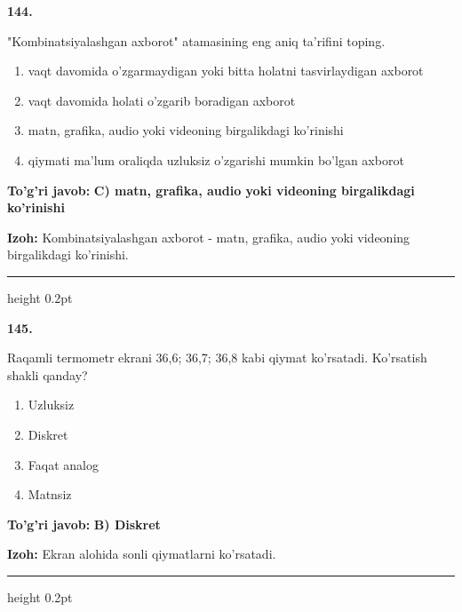 \documentclass[10pt,a4paper,oneside]{article}
\begin{document}
\noindent\textbf{\color{ink}144.}
\par
"Kombinatsiyalashgan axborot" atamasining eng aniq ta'rifini toping.
\begin{enumerate}[label=\Alph*),leftmargin=9mm]
\item vaqt davomida o'zgarmaydigan yoki bitta holatni tasvirlaydigan axborot
\item vaqt davomida holati o'zgarib boradigan axborot
\item matn, grafika, audio yoki videoning birgalikdagi ko'rinishi
\item qiymati ma'lum oraliqda uzluksiz o'zgarishi mumkin bo'lgan axborot
\end{enumerate}
\begin{tcolorbox}[enhanced,breakable,colback=teal!4,colframe=teal!50!black,boxrule=0.5pt,arc=1.1mm,left=3mm,right=3mm,top=1.7mm,bottom=1.7mm,before skip=2mm,after skip=2mm]
\textbf{\color{teal}To'g'ri javob:} \textbf{C) matn, grafika, audio yoki videoning birgalikdagi ko'rinishi}
\par\smallskip
\textbf{Izoh:} Kombinatsiyalashgan axborot - matn, grafika, audio yoki videoning birgalikdagi ko'rinishi.
\end{tcolorbox}
\vspace{2mm}\hrule height 0.2pt \vspace{3mm}

\noindent\textbf{\color{ink}145.}
\par
Raqamli termometr ekrani 36,6; 36,7; 36,8 kabi qiymat ko'rsatadi. Ko'rsatish shakli qanday?
\begin{enumerate}[label=\Alph*),leftmargin=9mm]
\item Uzluksiz
\item Diskret
\item Faqat analog
\item Matnsiz
\end{enumerate}
\begin{tcolorbox}[enhanced,breakable,colback=teal!4,colframe=teal!50!black,boxrule=0.5pt,arc=1.1mm,left=3mm,right=3mm,top=1.7mm,bottom=1.7mm,before skip=2mm,after skip=2mm]
\textbf{\color{teal}To'g'ri javob:} \textbf{B) Diskret}
\par\smallskip
\textbf{Izoh:} Ekran alohida sonli qiymatlarni ko'rsatadi.
\end{tcolorbox}
\vspace{2mm}\hrule height 0.2pt \vspace{3mm}
\end{document}
